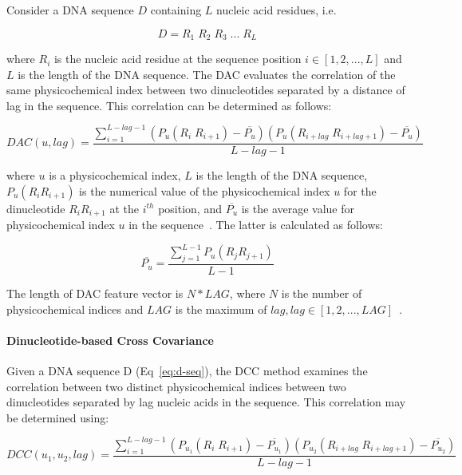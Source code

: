 Consider a \gls{DNA} sequence $D$ containing $L$ nucleic acid residues, i.e.

\begin{equation}\label{eq:d-seq}
    D = R_{1}\;R_{2}\;R_{3}\;...\;R_{L}
\end{equation}

\noindent where $R_{i}$ is the nucleic acid residue at the sequence position $i \in [1,2,...,L]$ and $L$ is the length of the \gls{DNA} sequence. The \gls{DAC} evaluates the correlation of the same physicochemical index between two dinucleotides separated by a distance of lag in the sequence. This correlation can be determined as follows:

\begin{equation}\label{eq:DAC}
    DAC(u,lag) = \frac{\sum_{i=1}^{L-lag-1}(P_{u}(R_{i}\;R_{i+1}) - \overline{P_{u}})(P_{u}(R_{i+lag}\;R_{i+lag+1}) - \overline{P_{u}})}{L-lag-1}
\end{equation}

\noindent where $u$ is a physicochemical index, $L$ is the length of the \gls{DNA} sequence, $P_{u}(R_{i}R_{i+1})$ is the numerical value of the physicochemical index $u$ for the dinucleotide $R_{i}R_{i+1}$ at the $i^{th}$ position, and $\overline{P_{u}}$ is the average value for physicochemical index $u$ in the sequence~\cite{Zhu2016RDNAse:CHINA}. The latter is calculated as follows:

\begin{equation}\label{eq:DAC-PU}
    \overline{P_{u}} = \frac{\sum_{j=1}^{L-1}P_{u}(R_{j}R_{j+1})}{L-1}
\end{equation}

The length of \gls{DAC} feature vector is $N*LAG$, where $N$ is the number of physicochemical indices and $LAG$ is the maximum of $lag, lag \in [1,2,...,LAG]$~\cite{Zhu2016RDNAse:CHINA}.

\paragraph{Dinucleotide-based Cross Covariance}
Given a \gls{DNA} sequence D (Eq~\ref{eq:d-seq}), the \gls{DCC} method examines the correlation between two distinct physicochemical indices between two dinucleotides separated by lag nucleic acids in the sequence. This correlation may be determined using:

\begin{equation}\label{eq:DCC}
    DCC(u_{1},u_{2},lag) = \frac{\sum_{i=1}^{L-lag-1}(P_{u_{1}}(R_{i}\;R_{i+1}) - \overline{P_{u_{1}}})(P_{u_{2}}(R_{i+lag}\;R_{i+lag+1}) - \overline{P_{u_{2}}})}{L-lag-1}
\end{equation}

